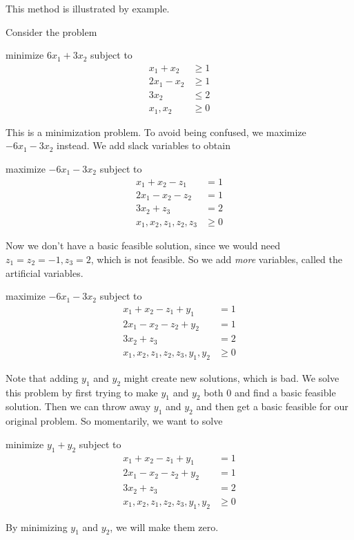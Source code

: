 \documentclass[a4paper]{article}
\begin{document}
This method is illustrated by example.
\begin{eg}
  Consider the problem
  \begin{center}
    minimize $6x_1 + 3x_2$ subject to
    \begin{align*}
      x_1 + x_2 &\geq 1\\
      2x_1 - x_2 &\geq 1\\
      3x_2 &\leq 2\\
      x_1, x_2 &\geq 0
    \end{align*}
  \end{center}
  This is a minimization problem. To avoid being confused, we maximize $-6x_1 - 3x_2$ instead. We add slack variables to obtain
  \begin{center}
    maximize $-6x_1 - 3x_2$ subject to
    \begin{align*}
      x_1 + x_2 - z_1 &= 1\\
      2x_1 - x_2 - z_2 &= 1\\
      3x_2 + z_3 &= 2\\
      x_1, x_2, z_1, z_2, z_3 &\geq 0
    \end{align*}
  \end{center}
  Now we don't have a basic feasible solution, since we would need $z_1 = z_2 = -1, z_3 = 2$, which is not feasible. So we add \emph{more} variables, called the artificial variables.
  \begin{center}
    maximize $-6x_1 - 3x_2$ subject to
    \begin{align*}
      x_1 + x_2 - z_1 + y_1&= 1\\
      2x_1 - x_2 - z_2 +y_2 &= 1\\
      3x_2 + z_3 &= 2\\
      x_1, x_2, z_1, z_2, z_3, y_1, y_2 &\geq 0
    \end{align*}
  \end{center}
  Note that adding $y_1$ and $y_2$ might create new solutions, which is bad. We solve this problem by first trying to make $y_1$ and $y_2$ both $0$ and find a basic feasible solution. Then we can throw away $y_1$ and $y_2$ and then get a basic feasible for our original problem. So momentarily, we want to solve
  \begin{center}
   minimize $y_1 + y_2$ subject to
    \begin{align*}
      x_1 + x_2 - z_1 + y_1&= 1\\
      2x_1 - x_2 - z_2 +y_2&= 1\\
      3x_2 + z_3 &= 2\\
      x_1, x_2, z_1, z_2, z_3, y_1, y_2 &\geq 0
    \end{align*}
  \end{center}
  By minimizing $y_1$ and $y_2$, we will make them zero.


\end{eg}
\end{document}
